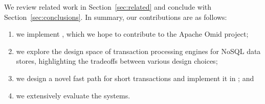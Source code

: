 We review related work in Section~\ref{sec:related} and conclude with Section~\ref{sec:conclusions}.
In summary, our contributions are as follows:
\begin{enumerate}
    \setlength{\itemsep}{1pt}
    \setlength{\parskip}{1pt}
    \setlength{\parsep}{1pt}  
\item we implement \sysll, which 
we hope to contribute to the Apache Omid project;
\item we explore the design space of transaction processing engines for NoSQL data stores, 
highlighting the tradeoffs between various design choices;  
\item we design a novel fast path for short transactions and implement it in \sys; and
\item we extensively evaluate the systems.
\end{enumerate}